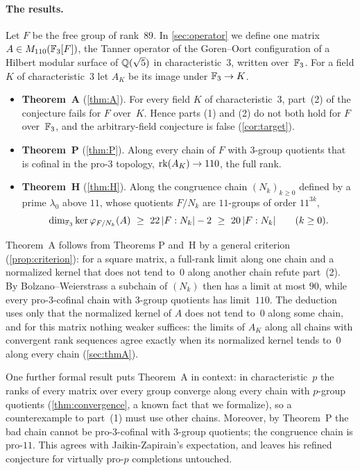 \paragraph{The results.} Let $F$ be the free group of rank~$89$. In \cref{sec:operator} we define one matrix
$A\in M_{110}(\mathbb{F}_3[F])$, the Tanner operator of the Goren--Oort configuration of a Hilbert modular surface of
$\mathbb{Q}(\sqrt5)$ in characteristic~$3$, written over~$\mathbb{F}_3$. For a field $K$ of characteristic~$3$ let $A_K$ be its image
under $\mathbb{F}_3\to K$.

\begin{itemize}
\item \textbf{Theorem~A} (\cref{thm:A}). For every field $K$ of characteristic~$3$, part~(2) of the conjecture fails for
$F$ over~$K$. Hence parts (1) and (2) do not both hold for $F$ over~$\mathbb{F}_3$, and the arbitrary-field conjecture is false
(\cref{cor:target}).
\item \textbf{Theorem~P} (\cref{thm:P}). Along every chain of $F$ with $3$-group quotients that is cofinal in the pro-$3$
topology, $\operatorname{rk}(A_K)\to110$, the full rank.
\item \textbf{Theorem~H} (\cref{thm:H}). Along the congruence chain $(N_k)_{k\ge0}$ defined by a prime $\lambda_0$ above
$11$, whose quotients $F/N_k$ are $11$-groups of order $11^{3k}$,
\[
  \dim_{\F_3}\ker\varphi_{F/N_k}(A)\ \ge\ 22\,\abs{F:N_k}-2\ \ge\ 20\,\abs{F:N_k}\qquad(k\ge0).
\]
\end{itemize}
Theorem~A follows from Theorems P and~H by a general criterion (\cref{prop:criterion}): for a square matrix, a full-rank
limit along one chain and a normalized kernel that does not tend to~$0$ along another chain refute part~(2). By
Bolzano--Weierstrass a subchain of $(N_k)$ then has a limit at most $90$, while every pro-$3$-cofinal chain with
$3$-group quotients has limit~$110$. The deduction uses only that the normalized kernel of $A$ does not tend to~$0$ along
some chain, and for this matrix nothing weaker suffices: the limits of $A_K$ along all chains with convergent rank
sequences agree exactly when its normalized kernel tends to~$0$ along every chain (\cref{sec:thmA}).

One further formal result puts Theorem~A in context: in characteristic~$p$ the ranks of every matrix over every group
converge along every chain with $p$-group quotients (\cref{thm:convergence}, a known fact that we formalize), so a
counterexample to part~(1) must use other chains. Moreover, by Theorem~P the bad chain cannot be pro-$3$-cofinal with
$3$-group quotients; the congruence chain is pro-$11$. This agrees with Jaikin-Zapirain's expectation, and leaves his
refined conjecture for virtually pro-$p$ completions untouched.

